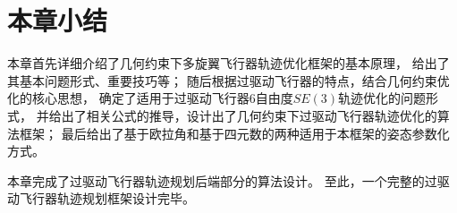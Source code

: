 \section{本章小结}\label{sec:summary_4}
本章首先详细介绍了几何约束下多旋翼飞行器轨迹优化框架的基本原理，
给出了其基本问题形式、重要技巧等；
随后根据过驱动飞行器的特点，结合几何约束优化的核心思想，
确定了适用于过驱动飞行器6自由度$SE(3)$轨迹优化的问题形式，
并给出了相关公式的推导，设计出了几何约束下过驱动飞行器轨迹优化的算法框架；
最后给出了基于欧拉角和基于四元数的两种适用于本框架的姿态参数化方式。

本章完成了过驱动飞行器轨迹规划后端部分的算法设计。
至此，一个完整的过驱动飞行器轨迹规划框架设计完毕。

